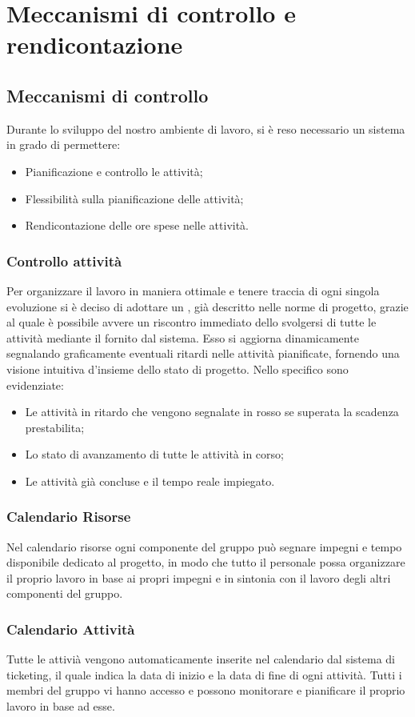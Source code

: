 \documentclass{scalatekids-article}
\begin{document}
\section{Meccanismi di controllo e rendicontazione}
\subsection{Meccanismi di controllo}
Durante lo sviluppo del nostro ambiente di lavoro, si è reso necessario un sistema in grado di permettere:
\begin{itemize}
  \item{Pianificazione e controllo le attività;}
  \item{Flessibilità sulla pianificazione delle attività;}
  \item{Rendicontazione delle ore spese nelle attività.}
\end{itemize}
\subsubsection{Controllo attività}
Per organizzare il lavoro in maniera ottimale e tenere traccia di ogni singola evoluzione si è deciso di adottare un , già descritto nelle norme di progetto, grazie al quale è
possibile avvere un riscontro immediato dello svolgersi di tutte le attività mediante il  fornito dal sistema. Esso si aggiorna dinamicamente segnalando graficamente eventuali ritardi nelle attività pianificate, fornendo una visione intuitiva d'insieme dello stato di progetto.
Nello specifico sono evidenziate:
\begin{itemize}
   \item{Le attività in ritardo che vengono segnalate in rosso se superata la scadenza prestabilita;}
   \item{Lo stato di avanzamento di tutte le attività in corso;}
   \item{Le attività già concluse e il tempo reale impiegato.}
\end{itemize}
\subsubsection{Calendario Risorse}
Nel calendario risorse ogni componente del gruppo può segnare impegni e tempo disponibile dedicato 
al progetto, in modo che tutto il personale possa organizzare il proprio lavoro in base ai propri
impegni e in sintonia con il lavoro degli altri componenti del gruppo.
\subsubsection{Calendario Attività}
Tutte le attivià vengono automaticamente inserite nel calendario dal sistema di ticketing, il quale
indica la data di inizio e la data di fine di ogni attività. Tutti i membri del gruppo vi hanno accesso
e possono monitorare e pianificare il proprio lavoro in base ad esse.
\end{document}
